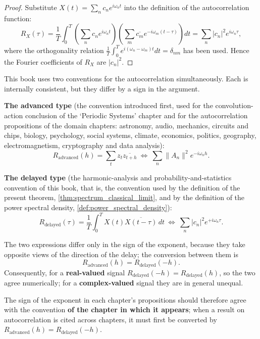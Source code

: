 \begin{proof}
Substitute $X(t) = \sum_n c_n e^{i\omega_n t}$ into the definition of the autocorrelation function:
\[
R_X(\tau) = \frac{1}{T}\int_0^T \left(\sum_n c_n e^{i\omega_n t}\right)\left(\sum_m \overline{c_m} e^{-i\omega_m (t-\tau)}\right) dt = \sum_n |c_n|^2 e^{i\omega_n \tau},
\]
where the orthogonality relation $\frac{1}{T}\int_0^T e^{i(\omega_n - \omega_m)t}dt = \delta_{nm}$ has been used. Hence the Fourier coefficients of $R_X$ are $|c_n|^2$.
\end{proof}

\begin{remark}\label{rem:autocorrelation_two_conventions}
This book uses two conventions for the autocorrelation simultaneously. Each is internally consistent, but they differ by a sign in the argument.

\textbf{The advanced type} (the convention introduced first, used for the convolution-action conclusion of the `Periodic Systems' chapter and for the autocorrelation propositions of the domain chapters: astronomy, audio, mechanics, circuits and chips, biology, psychology, social systems, climate, economics, politics, geography, electromagnetism, cryptography and data analysis):
\[
R_{\text{advanced}}(h)=\sum_t z_t\overline{z_{t+h}}
\ \Longleftrightarrow\
\sum_n \|A_n\|^2 e^{-i\omega_n h}.
\]

\textbf{The delayed type} (the harmonic-analysis and probability-and-statistics convention of this book, that is, the convention used by the definition of the present theorem, \cref{thm:spectrum_classical_limit}, and by the definition of the power spectral density, \cref{def:power_spectral_density}):
\[
R_{\text{delayed}}(\tau)=\frac{1}{T}\int_0^T X(t)\overline{X(t-\tau)}\,dt
\ \Longleftrightarrow\
\sum_n |c_n|^2 e^{+i\omega_n \tau}.
\]

The two expressions differ only in the sign of the exponent, because they take opposite views of the direction of the delay; the conversion between them is
\[
R_{\text{advanced}}(h)=R_{\text{delayed}}(-h).
\]
Consequently, for a \textbf{real-valued} signal $R_{\text{delayed}}(-h)=R_{\text{delayed}}(h)$, so the two agree numerically; for a \textbf{complex-valued} signal they are in general unequal.

The sign of the exponent in each chapter's propositions should therefore agree with the convention \textbf{of the chapter in which it appears}; when a result on autocorrelation is cited across chapters, it must first be converted by $R_{\text{advanced}}(h)=R_{\text{delayed}}(-h)$.
\end{remark}

